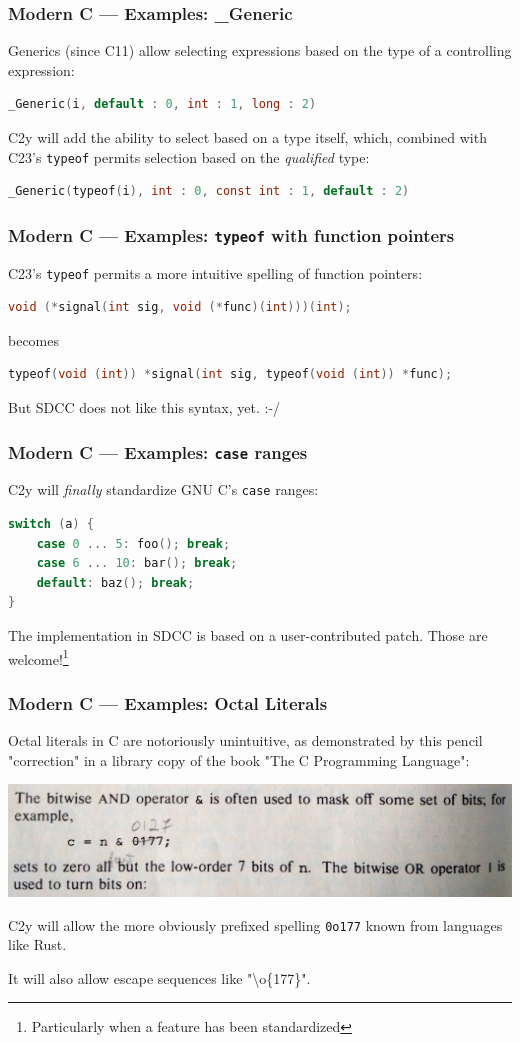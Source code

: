 \documentclass[xcolor=dvipsnames]{beamer}
\begin{document}
\begin{frame}[fragile]
	\frametitle{Modern C --- Examples: \_Generic}
	Generics (since C11) allow selecting expressions based on the type of a controlling expression:
\begin{lstlisting}[language=C,basicstyle=\footnotesize]
_Generic(i, default : 0, int : 1, long : 2)
\end{lstlisting}
C2y will add the ability to select based on a type itself, which, combined with C23's \texttt{typeof} permits selection based on the \textit{qualified} type:
\begin{lstlisting}[language=C,basicstyle=\footnotesize]
_Generic(typeof(i), int : 0, const int : 1, default : 2)
\end{lstlisting}

\end{frame}

\begin{frame}[fragile]
	\frametitle{Modern C --- Examples: \texttt{typeof} with function pointers}
	C23's \texttt{typeof} permits a more intuitive spelling of function pointers:
\begin{lstlisting}[language=C,basicstyle=\footnotesize]
void (*signal(int sig, void (*func)(int)))(int);
\end{lstlisting}
becomes
\begin{lstlisting}[language=C,basicstyle=\footnotesize]
typeof(void (int)) *signal(int sig, typeof(void (int)) *func);
\end{lstlisting}
But SDCC does not like this syntax, yet. :-/
\end{frame}

\begin{frame}[fragile]
	\frametitle{Modern C --- Examples: \texttt{case} ranges}
	C2y will \textit{finally} standardize GNU C's \texttt{case} ranges:
\begin{lstlisting}[language=C,basicstyle=\footnotesize]
switch (a) {
    case 0 ... 5: foo(); break;
    case 6 ... 10: bar(); break;
    default: baz(); break;
}
\end{lstlisting}
The implementation in SDCC is based on a user-contributed patch. Those are welcome!\footnote{Particularly when a feature has been standardized}
\end{frame}

\begin{frame}
	\frametitle{Modern C --- Examples: Octal Literals}
	Octal literals in C are notoriously unintuitive, as demonstrated by this pencil "correction" in a library copy of the book "The C Programming Language":
	\centerline{\includegraphics[scale=0.8]{octal.jpg}}
	C2y will allow the more obviously prefixed spelling \texttt{0o177} known from languages like Rust.

	It will also allow escape sequences like "\textbackslash o\{177\}".
\end{frame}
\end{document}
